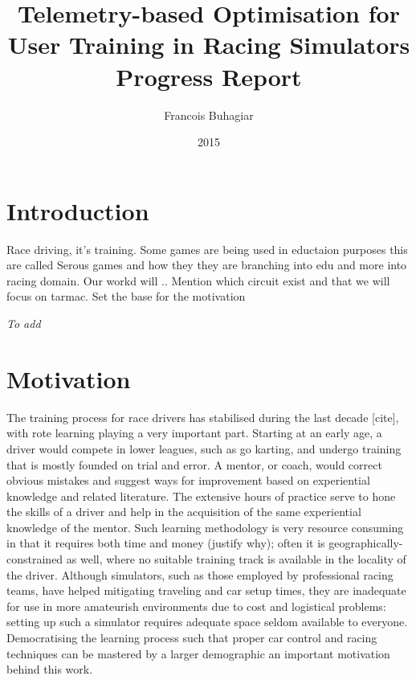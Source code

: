 \documentclass{article}
\title{Telemetry-based Optimisation for User Training in Racing Simulators \\ Progress Report}
\author{Francois Buhagiar}
\date{2015}
\begin{document}

\maketitle

\setcounter{page}{1}

\newpage
\begin{abstract}
\end{abstract}

\newpage
\section{Introduction}
	Race driving, it's training. Some games are being used in eductaion purposes this are called Serous games and how they they are branching into edu and more into racing domain. Our workd will .. Mention which circuit exist and that we will focus on tarmac.
	Set the base for the motivation

	\emph{To add}

\section{Motivation}
The training process for race drivers has stabilised during the last decade [cite], with rote learning playing a very important part. Starting at an early age, a driver would compete in lower leagues, such as go karting, and undergo training that is mostly founded on trial and error. A mentor, or coach, would correct obvious mistakes and suggest ways for improvement based on experiential knowledge and related literature. The extensive hours of practice serve to hone the skills of a driver and help in the acquisition of the same experiential knowledge of the mentor. Such learning methodology is very resource consuming in that it requires both time and money (justify why); often it is geographically-constrained as well, where no suitable training track is available in the locality of the driver. Although simulators, such as those employed by professional racing teams, have helped mitigating traveling and car setup times, they are inadequate for use in more amateurish environments due to cost and logistical problems: setting up such a simulator requires adequate space seldom available to everyone. Democratising the learning process such that proper car control and racing techniques can be mastered by a larger demographic an important motivation behind this work.
\end{document}
